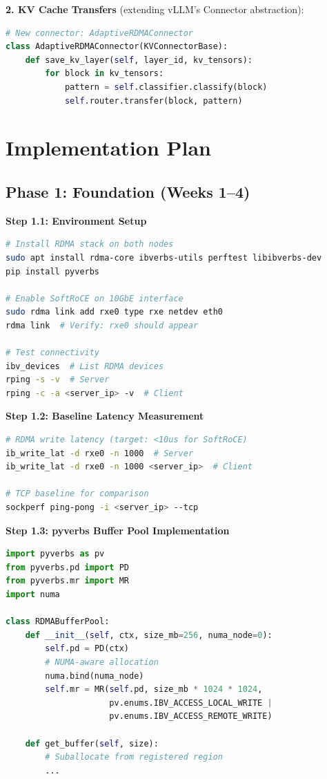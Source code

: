 \documentclass[10pt,letterpaper]{article}
\begin{document}
\textbf{2. KV Cache Transfers} (extending vLLM's Connector abstraction):
\begin{lstlisting}[language=Python]
# New connector: AdaptiveRDMAConnector
class AdaptiveRDMAConnector(KVConnectorBase):
    def save_kv_layer(self, layer_id, kv_tensors):
        for block in kv_tensors:
            pattern = self.classifier.classify(block)
            self.router.transfer(block, pattern)
\end{lstlisting}

\section{Implementation Plan}

\subsection{Phase 1: Foundation (Weeks 1--4)}

\textbf{Step 1.1: Environment Setup}
\begin{lstlisting}[language=bash]
# Install RDMA stack on both nodes
sudo apt install rdma-core ibverbs-utils perftest libibverbs-dev
pip install pyverbs

# Enable SoftRoCE on 10GbE interface
sudo rdma link add rxe0 type rxe netdev eth0
rdma link  # Verify: rxe0 should appear

# Test connectivity
ibv_devices  # List RDMA devices
rping -s -v  # Server
rping -c -a <server_ip> -v  # Client
\end{lstlisting}

\textbf{Step 1.2: Baseline Latency Measurement}
\begin{lstlisting}[language=bash]
# RDMA write latency (target: <10us for SoftRoCE)
ib_write_lat -d rxe0 -n 1000  # Server
ib_write_lat -d rxe0 -n 1000 <server_ip>  # Client

# TCP baseline for comparison
sockperf ping-pong -i <server_ip> --tcp
\end{lstlisting}

\textbf{Step 1.3: pyverbs Buffer Pool Implementation}
\begin{lstlisting}[language=Python]
import pyverbs as pv
from pyverbs.pd import PD
from pyverbs.mr import MR
import numa

class RDMABufferPool:
    def __init__(self, ctx, size_mb=256, numa_node=0):
        self.pd = PD(ctx)
        # NUMA-aware allocation
        numa.bind(numa_node)
        self.mr = MR(self.pd, size_mb * 1024 * 1024,
                     pv.enums.IBV_ACCESS_LOCAL_WRITE |
                     pv.enums.IBV_ACCESS_REMOTE_WRITE)
        
    def get_buffer(self, size):
        # Suballocate from registered region
        ...
\end{lstlisting}
\end{document}
